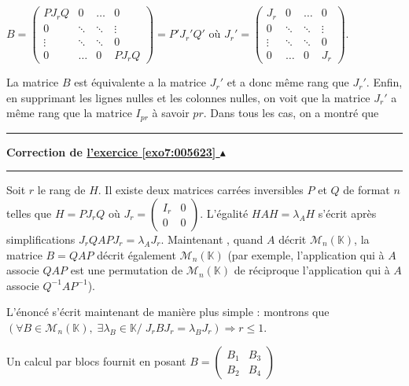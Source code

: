 \documentclass[11pt,a4paper]{article}
\newcommand{\Kk}{\mathbb{K}} \newcommand{\K}{\mathbb{K}}
\newcounter{exo}
\newcommand{\correction}[1]{\hypertarget{cor7:#1}{}\label{cor7:#1}{\bf Correction de \hyperlink{exo7:#1}{l'exercice \ref{exo7:#1} $\blacktriangle$}}\vspace{1mm}\hrule\vspace{1mm}}
\newcommand{\fincorrection}{\vspace{1mm}\hrule\vspace*{7mm}}
\begin{document}
\begin{center}
$B=\left(
\begin{array}{cccc}
PJ_rQ&0&\ldots&0\\
0&\ddots&\ddots&\vdots\\
\vdots&\ddots&\ddots&0\\
0&\ldots&0&PJ_rQ
\end{array}
\right)=P'J_r'Q'$ où $J_r'=\left(
\begin{array}{cccc}
J_r&0&\ldots&0\\
0&\ddots&\ddots&\vdots\\
\vdots&\ddots&\ddots&0\\
0&\ldots&0&J_r
\end{array}
\right)$.
\end{center}

La matrice $B$ est équivalente a la matrice $J_r'$ et a donc même rang que $J_r'$. Enfin, en supprimant les lignes nulles et les colonnes nulles, on voit que la matrice $J_r'$ a même rang que la matrice $I_{pr}$ à savoir $pr$. Dans tous les cas, on a montré que  

\begin{center}
\end{center}
\fincorrection
\correction{005623}
Soit $r$ le rang de $H$. Il existe deux matrices carrées inversibles $P$ et $Q$ de format $n$ telles que $H =PJ_rQ$ où $J_r=\left(
\begin{array}{cc}
I_r&0\\
0&0
\end{array}
\right)$. L'égalité $HAH =\lambda_AH$ s'écrit après simplifications $J_rQAPJ_r=\lambda_AJ_r$.
Maintenant , quand $A$ décrit $\mathcal{M}_n(\Kk)$, la matrice $B=QAP$ décrit également $\mathcal{M}_n(\Kk)$ (par exemple, l'application qui à $A$ associe $QAP$ est une permutation de $\mathcal{M}_n(\Kk)$ de réciproque l'application qui à $A$ associe $Q^{-1}AP^{-1}$).

L'énoncé s'écrit maintenant de manière plus simple : montrons que $(\forall B\in\mathcal{M}_n(\Kk),\;\exists\lambda_B\in\Kk/\;J_rBJ_r =\lambda_BJ_r)\Rightarrow r\leqslant 1$.

Un calcul par blocs fournit en posant $B=\left(
\begin{array}{cc}
B_1&B_3\\
B_2&B_4
\end{array}
\right)$
\end{document}
